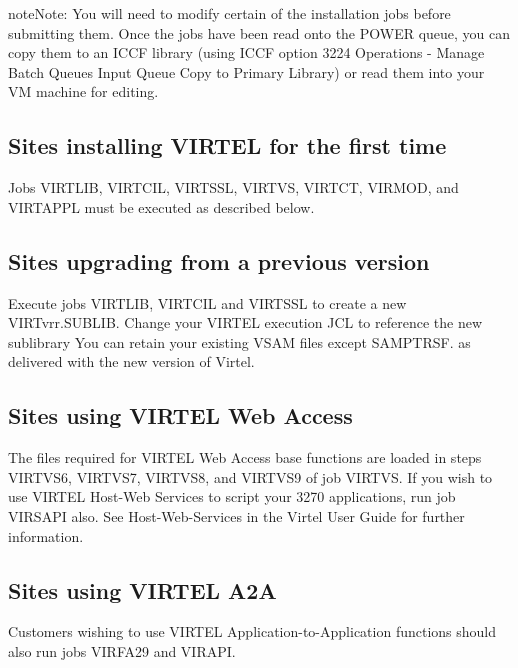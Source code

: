 \documentclass[letterpaper,10pt,english]{sphinxmanual}
\begin{document}
\begin{sphinxadmonition}{note}{Note:}
You will need to modify certain of the installation jobs before submitting them. Once the jobs have been read onto the POWER queue, you can copy them to an ICCF library (using ICCF option 3224 Operations - Manage Batch Queues \textendash{} Input Queue \textendash{} Copy to Primary Library) or read them into your VM machine for editing.
\end{sphinxadmonition}


\subsection{Sites installing VIRTEL for the first time}
\label{\detokenize{Installation_Guide:sites-installing-virtel-for-the-first-time}}
Jobs VIRTLIB, VIRTCIL, VIRTSSL, VIRTVS, VIRTCT, VIRMOD, and VIRTAPPL must be executed as described below.


\subsection{Sites upgrading from a previous version}
\label{\detokenize{Installation_Guide:sites-upgrading-from-a-previous-version}}
Execute jobs VIRTLIB, VIRTCIL and VIRTSSL to create a new VIRTvrr.SUBLIB. Change your VIRTEL execution JCL to reference the new sublibrary You can retain your existing VSAM files except SAMPTRSF.  as delivered with the new version of Virtel.


\subsection{Sites using VIRTEL Web Access}
\label{\detokenize{Installation_Guide:sites-using-virtel-web-access}}
The files required for VIRTEL Web Access base functions are loaded in steps VIRTVS6, VIRTVS7, VIRTVS8, and VIRTVS9 of job VIRTVS. If you wish to use VIRTEL Host-Web Services to script your 3270 applications, run job VIRSAPI also. See Host-Web-Services in the Virtel User Guide for further information.


\subsection{Sites using VIRTEL A2A}
\label{\detokenize{Installation_Guide:sites-using-virtel-a2a}}
Customers wishing to use VIRTEL Application-to-Application functions should also run jobs VIRFA29 and VIRAPI.
\end{document}
